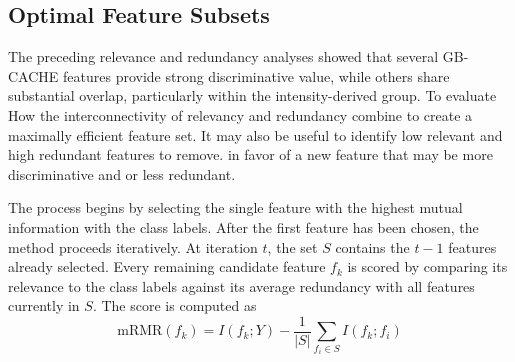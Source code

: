 \documentclass{erauthesis}
\begin{document}
    
    

\subsection{Optimal Feature Subsets}

The preceding relevance and redundancy analyses showed that several GB-CACHE features provide strong discriminative value, while others share substantial overlap, particularly within the intensity-derived group.
To evaluate How the interconnectivity of relevancy and redundancy combine to create a maximally efficient feature set. It may also be useful to identify low relevant and high redundant features to remove. in favor of a new feature that may be more discriminative and or less redundant. 

The process begins by selecting the single feature with the highest mutual information with the class labels. After the first feature has been chosen, the method proceeds iteratively. At iteration $t$, the set $S$ contains the $t-1$ features already selected. Every remaining candidate feature $f_k$ is scored by comparing its relevance to the class labels against its average redundancy with all features currently in $S$. The score is computed as
\begin{equation}
\text{mRMR}(f_k) = I(f_k; Y) - \frac{1}{|S|} \sum_{f_i \in S} I(f_k; f_i)
\end{equation}
\end{document}
